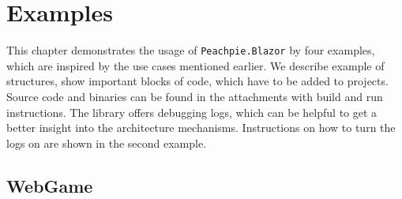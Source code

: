 \chapter{Examples}

This chapter demonstrates the usage of \texttt{Peachpie.Blazor} by four examples, which are inspired by the use cases mentioned earlier.
We describe example of structures, show important blocks of code, which have to be added to projects.
Source code and binaries can be found in the attachments with build and run instructions.
The library offers debugging logs, which can be helpful to get a better insight into the architecture mechanisms.
Instructions on how to turn the logs on are shown in the second example.

\section{WebGame}

